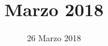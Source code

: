 


\title{ Marzo 2018}
\author{\GroupName}

\date{26 Marzo 2018}



\frenchspacing

\makeFrontPage



